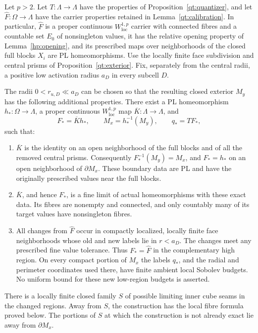 \begin{lemma}\label{qt:central-carrier}
Let $p>2$.  Let $T:\Lambda\to\Lambda$ have the properties of
Proposition~\ref{qt:quantizer}, and let
$\widehat F:\Omega\to\Lambda$ have the carrier properties retained in
Lemma~\ref{qt:calibration}.  In particular, $\widehat F$ is a proper
continuous $W^{1,p}_{\mathrm{loc}}$ carrier with connected fibres and a
countable set $E_0$ of nonsingleton values, it has the relative opening
property of Lemma~\ref{hp:opening}, and its prescribed maps over
neighborhoods of the closed full blocks $X_i$ are PL homeomorphisms.
Use the locally finite face subdivision and central prisms of
Proposition~\ref{qt:exterior}.  Fix, separately from the central radii, a
positive low activation radius $a_D$ in every subcell $D$.

The radii $0<r_{u,D}\ll a_D$ can be chosen so that the resulting closed
exterior $M_y$ has the following additional properties.  There exist a
PL homeomorphism $h_*:\Omega\to\Lambda$, a proper continuous
$W^{1,p}_{\mathrm{loc}}$ map $\overline K:\Lambda\to\Lambda$, and
\[
 F_*=\overline K h_*,\qquad M_x=h_*^{-1}(M_y),\qquad q_*=TF_* ,
\]
such that:
\begin{enumerate}
\item $\overline K$ is the identity on an open neighborhood of the
full blocks and of all the removed central prisms.  Consequently
$F_*^{-1}(M_y)=M_x$, and $F_*=h_*$ on an open neighborhood of
$\partial M_x$.  These boundary data are PL and have the originally
prescribed values near the full blocks.
\item $\overline K$, and hence $F_*$, is a fine limit of actual
homeomorphisms with these exact data.  Its fibres are nonempty and
connected, and only countably many of its target values have
nonsingleton fibres.
\item All changes from $\widehat F$ occur in compactly localized,
locally finite face neighborhoods whose old and new labels lie in
$r<a_D$.  The changes meet any prescribed fine value tolerance.
Thus $F_*=\widehat F$ in the complementary high region.  On every
compact portion of $M_x$ the labels $q_*$, and the radial and perimeter
coordinates used there, have finite ambient local Sobolev budgets.
No uniform bound for these new low-region budgets is asserted.
\end{enumerate}
There is a locally finite closed family $S$ of possible limiting inner
cube seams in the changed regions.  Away from $S$, the construction
has the local fibre formula proved below.  The portions of $S$ at which
the construction is not already exact lie away from $\partial M_x$.
\end{lemma}

